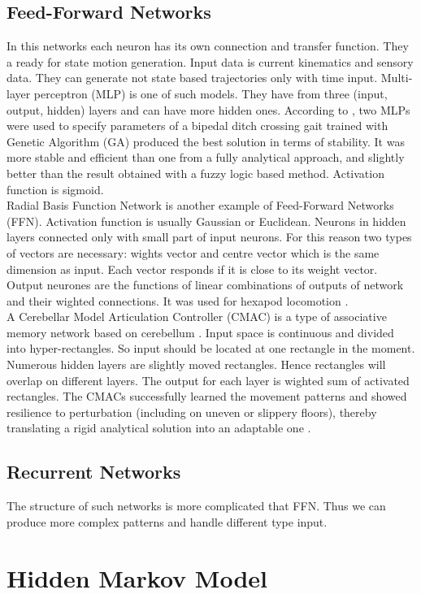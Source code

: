 \documentclass[11pt,a4paper]{report}
\begin{document}
\subsection{Feed-Forward Networks}
In this networks each neuron has its own connection and transfer function. They a ready for state motion generation.  Input data is current kinematics and sensory data. They can generate not state based trajectories only with time input. Multi-layer perceptron (MLP) is one of such models. They have from three (input, output, hidden) layers and can have more hidden ones. According to \cite{vundavilli2010dynamically}, two MLPs were used to specify parameters of a bipedal ditch crossing gait trained with Genetic Algorithm (GA) produced the best solution in terms of stability. It was more stable and efficient than one from a fully analytical approach, and slightly better than the result obtained with a fuzzy logic based method. Activation function is sigmoid.\\
Radial Basis Function Network is another example of Feed-Forward Networks (FFN). Activation function is usually Gaussian or Euclidean. Neurons in hidden layers connected only with small part of input neurons. For this reason two types of vectors are necessary: wights vector and centre vector which is the same dimension as input. Each vector responds if it is close to its weight vector. Output neurones are the functions of linear combinations of outputs of network and their wighted connections.
It was used for hexapod locomotion \cite{ilg1995learning}.\\
A Cerebellar Model Articulation Controller (CMAC) is a type of associative memory network based on cerebellum \cite{albus1975new}. Input space is continuous and divided into hyper-rectangles. So input should be located at one rectangle in the moment. Numerous hidden layers are slightly moved rectangles. Hence rectangles will overlap on different layers. The output for each layer is wighted sum of activated rectangles. The CMACs successfully learned the movement patterns and showed resilience to perturbation (including on uneven or slippery floors), thereby translating a rigid analytical solution into an adaptable one \cite{sabourin2005robustness}.
\subsection{Recurrent Networks}
The structure of such networks is more complicated that FFN. Thus we can produce more complex patterns and handle different type input. 
\section{Hidden Markov Model}
\end{document}
